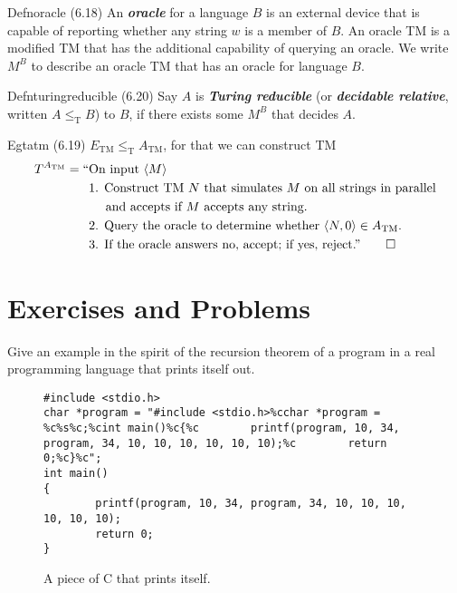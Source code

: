 \begin{reference}{Defn}{oracle}
  (6.18) An \textbf{\textit{oracle}} for a language $B$ is an external device that is capable of reporting whether any string $w$ is a member of $B$. An oracle TM is a modified TM that has the additional capability of querying an oracle. We write $M^B$ to describe an oracle TM that has an oracle for language $B$.
\end{reference}

\begin{reference}{Defn}{turingreducible}
  (6.20) Say $A$ is \textbf{\textit{Turing reducible}} (or \textbf{\textit{decidable relative}}, written $A\leq_{\mathrm{T}} B$) to $B$, if there exists some $M^B$ that decides $A$.
\end{reference}

\begin{reference}{Eg}{tatm}
  (6.19) $E_{\mathrm{TM}}\leq_{\mathrm{T}} A_{\mathrm{TM}}$, for that we can construct TM
  \begin{align*}
    T^{A_{\mathrm{TM}}}=\text{``} & \text{On input }\langle M\rangle                                                       \\
                                  & \text{1. Construct TM }N\text{ that simulates }M\text{ on all strings in parallel}     \\
                                  & \quad\text{ and accepts if }M\text{ accepts any string.}                               \\
                                  & \text{2. Query the oracle to determine whether }\langle N,0\rangle\in A_{\mathrm{TM}}. \\
                                  & \text{3. If the oracle answers no, accept; if yes, reject.''}\qedhere
  \end{align*}
\end{reference}

\section*{Exercises and Problems}

\begin{exercise}
  Give an example in the spirit of the recursion theorem of a program in a real programming language that prints itself out.
\end{exercise}

\begin{figure}[H]
  \begin{lstlisting}
#include <stdio.h>
char *program = "#include <stdio.h>%cchar *program = %c%s%c;%cint main()%c{%c        printf(program, 10, 34, program, 34, 10, 10, 10, 10, 10, 10);%c        return 0;%c}%c";
int main()
{
        printf(program, 10, 34, program, 34, 10, 10, 10, 10, 10, 10);
        return 0;
}
\end{lstlisting}
  \caption{A piece of C that prints itself.}
\end{figure}

